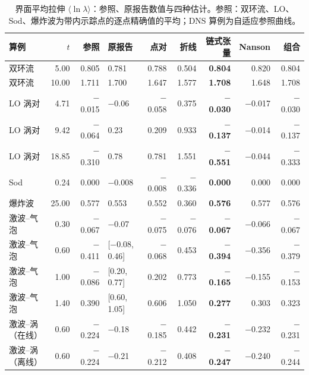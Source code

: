 \documentclass[10.5pt,a4paper]{article}
\theoremstyle{plain}
\begin{document}
\begin{table}[H]\centering\small
\caption{界面平均拉伸 $\langle\ln\lambda\rangle$：参照、原报告数值与四种估计。参照：双环流、LO、Sod、爆炸波为带内示踪点的逐点精确值的平均；DNS 算例为自适应参照曲线。}\label{tab:main}
\begin{tabular}{lrrlrrrrr}\toprule
算例 & $t$ & 参照 & 原报告 & 点对 & 折线 & \textbf{链式张量} & Nanson & 组合 \\\midrule
双环流 & 5.00 & 0.805 & 0.781 & 0.788 & 0.504 & \textbf{0.804} & 0.820 & 0.804 \\
双环流 & 10.00 & 1.711 & 1.700 & 1.647 & 1.577 & \textbf{1.708} & 1.648 & 1.708 \\
LO 涡对 & 4.71 & $-$0.015 & $-$0.06 & $-$0.058 & 0.375 & \textbf{$-$0.030} & $-$0.017 & $-$0.030 \\
LO 涡对 & 9.42 & $-$0.064 & 0.23 & 0.209 & 0.933 & \textbf{$-$0.137} & $-$0.014 & $-$0.137 \\
LO 涡对 & 18.85 & $-$0.310 & 0.78 & 0.781 & 1.551 & \textbf{$-$0.551} & $-$0.044 & $-$0.333 \\
Sod & 0.24 & 0.000 & $-$0.008 & $-$0.008 & $-$0.336 & \textbf{0.000} & 0.000 & 0.000 \\
爆炸波 & 25.00 & 0.577 & 0.553 & 0.552 & 0.360 & \textbf{0.576} & 0.577 & 0.576 \\
激波–气泡 & 0.30 & $-$0.067 & $-$0.07 & $-$0.075 & $-$0.076 & \textbf{$-$0.067} & $-$0.066 & $-$0.067 \\
激波–气泡 & 0.60 & $-$0.411 & [$-$0.08, 0.46] & $-$0.068 & 0.453 & \textbf{$-$0.394} & $-$0.356 & $-$0.379 \\
激波–气泡 & 1.00 & $-$0.086 & [0.20, 0.77] & 0.202 & 0.773 & \textbf{$-$0.165} & $-$0.155 & $-$0.153 \\
激波–气泡 & 1.40 & 0.390 & [0.60, 1.05] & 0.606 & 1.050 & \textbf{0.277} & 0.303 & 0.323 \\
激波–涡（在线） & 0.60 & $-$0.224 & $-$0.18 & $-$0.185 & 0.442 & \textbf{$-$0.231} & $-$0.232 & $-$0.231 \\
激波–涡（离线） & 0.60 & $-$0.224 & $-$0.21 & $-$0.212 & 0.408 & \textbf{$-$0.247} & $-$0.240 & $-$0.244 \\\bottomrule
\end{tabular}
\end{table}
\end{document}
